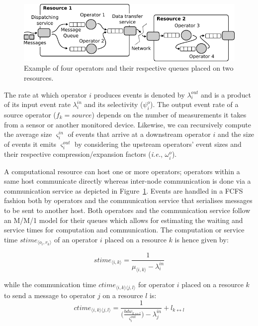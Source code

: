 \begin{figure}
  \centering
  \includegraphics[width=1\columnwidth]{Figures/resource_model.pdf}
  \caption{Example of four operators and their respective queues placed on two resources.}
  \label{fig:deployment}
\end{figure}

The rate at which operator $i$ produces events is denoted by $\lambda_i^{out}$ and is a product of its input event rate $\lambda_i^{in}$ and its selectivity ($\psi^o_i$). The output event rate of a source operator ($f_k=source$) depends on the number of measurements it takes from a sensor or another monitored device. Likewise, we can recursively compute the average size $\varsigma_i^{in}$ of events that arrive at a downstream operator $i$ and the size of events it emits $\varsigma_i^{out}$ by considering the upstream operators' event sizes and their respective compression/expansion factors (\textit{i.e.}, $\omega^o_i$).


A computational resource can host one or more operators; operators within a same host communicate directly whereas inter-node communication is done via a communication service as depicted in Figure~\ref{fig:deployment}. Events are handled in a \ac{FCFS} fashion both by operators and the communication service that serialises messages to be sent to another host. Both operators and the communication service follow an M/M/1 model for their queues which allows for estimating the waiting and service times for computation and communication. The computation or service time $stime_{\langle o_i,r_k\rangle}$ of an operator $i$ placed on a resource $k$ is hence given by:

\begin{equation}
stime_{\langle i,k\rangle} = \frac{1}{\mu_{\langle i,k\rangle} - \lambda_{i}^{in}}
\label{eq:computation}
\end{equation}

\noindent while the communication time $ctime_{\langle i,k\rangle\langle j,l\rangle}$ for operator $i$ placed on a resource $k$ to send a message to operator $j$ on a resource $l$ is:
\begin{equation}
ctime_{\langle i,k\rangle\langle j,l\rangle} = \frac{1}{\Big(\frac{bdw_{k\leftrightarrow l}}{\varsigma_{i}^{out}}\Big) - \lambda_{j}^{in}} + l_{k\leftrightarrow l}
\label{eq:communication}
\end{equation}

